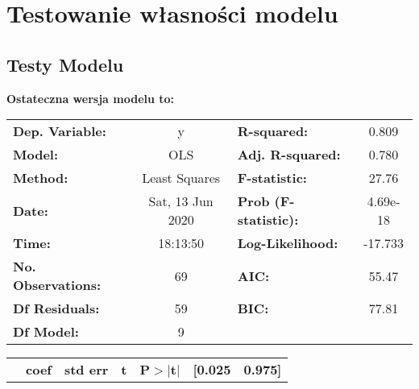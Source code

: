\documentclass[11pt,a4paper]{article}
\begin{document}
		
\section{Testowanie własności modelu}

	
	\subsection{Testy Modelu}
	\textbf{Ostateczna wersja modelu to:}
	
	\begin{center}
		\begin{tabular}{lclc}
			 
			\textbf{Dep. Variable:}           &        y         & \textbf{  R-squared:         } &     0.809   \\
			\textbf{Model:}                   &       OLS        & \textbf{  Adj. R-squared:    } &     0.780   \\
			\textbf{Method:}                  &  Least Squares   & \textbf{  F-statistic:       } &     27.76   \\
			\textbf{Date:}                    & Sat, 13 Jun 2020 & \textbf{  Prob (F-statistic):} &  4.69e-18   \\
			\textbf{Time:}                    &     18:13:50     & \textbf{  Log-Likelihood:    } &   -17.733   \\
			\textbf{No. Observations:}        &          69      & \textbf{  AIC:               } &     55.47   \\
			\textbf{Df Residuals:}            &          59      & \textbf{  BIC:               } &     77.81   \\
			\textbf{Df Model:}                &           9      & \textbf{                     } &             \\
			 
		\end{tabular}
		\begin{tabular}{lcccccc}
			& \textbf{coef} & \textbf{std err} & \textbf{t} & \textbf{P$> |$t$|$} & \textbf{[0.025} & \textbf{0.975]}  \\
			 

\end{tabular}
\end{center}
\end{document}
